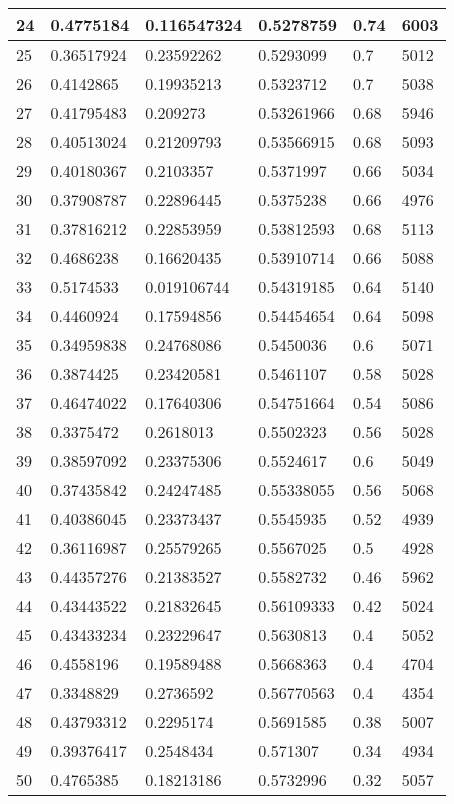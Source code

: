 \begin{longtable}{|l|l|l|l|l|l|}
24 & 0.4775184 & 0.116547324 & 0.5278759 & 0.74 & 6003 \\ \hline 
25 & 0.36517924 & 0.23592262 & 0.5293099 & 0.7 & 5012 \\ \hline 
26 & 0.4142865 & 0.19935213 & 0.5323712 & 0.7 & 5038 \\ \hline 
27 & 0.41795483 & 0.209273 & 0.53261966 & 0.68 & 5946 \\ \hline 
28 & 0.40513024 & 0.21209793 & 0.53566915 & 0.68 & 5093 \\ \hline 
29 & 0.40180367 & 0.2103357 & 0.5371997 & 0.66 & 5034 \\ \hline 
30 & 0.37908787 & 0.22896445 & 0.5375238 & 0.66 & 4976 \\ \hline 
31 & 0.37816212 & 0.22853959 & 0.53812593 & 0.68 & 5113 \\ \hline 
32 & 0.4686238 & 0.16620435 & 0.53910714 & 0.66 & 5088 \\ \hline 
33 & 0.5174533 & 0.019106744 & 0.54319185 & 0.64 & 5140 \\ \hline 
34 & 0.4460924 & 0.17594856 & 0.54454654 & 0.64 & 5098 \\ \hline 
35 & 0.34959838 & 0.24768086 & 0.5450036 & 0.6 & 5071 \\ \hline 
36 & 0.3874425 & 0.23420581 & 0.5461107 & 0.58 & 5028 \\ \hline 
37 & 0.46474022 & 0.17640306 & 0.54751664 & 0.54 & 5086 \\ \hline 
38 & 0.3375472 & 0.2618013 & 0.5502323 & 0.56 & 5028 \\ \hline 
39 & 0.38597092 & 0.23375306 & 0.5524617 & 0.6 & 5049 \\ \hline 
40 & 0.37435842 & 0.24247485 & 0.55338055 & 0.56 & 5068 \\ \hline 
41 & 0.40386045 & 0.23373437 & 0.5545935 & 0.52 & 4939 \\ \hline 
42 & 0.36116987 & 0.25579265 & 0.5567025 & 0.5 & 4928 \\ \hline 
43 & 0.44357276 & 0.21383527 & 0.5582732 & 0.46 & 5962 \\ \hline 
44 & 0.43443522 & 0.21832645 & 0.56109333 & 0.42 & 5024 \\ \hline 
45 & 0.43433234 & 0.23229647 & 0.5630813 & 0.4 & 5052 \\ \hline 
46 & 0.4558196 & 0.19589488 & 0.5668363 & 0.4 & 4704 \\ \hline 
47 & 0.3348829 & 0.2736592 & 0.56770563 & 0.4 & 4354 \\ \hline 
48 & 0.43793312 & 0.2295174 & 0.5691585 & 0.38 & 5007 \\ \hline 
49 & 0.39376417 & 0.2548434 & 0.571307 & 0.34 & 4934 \\ \hline 
50 & 0.4765385 & 0.18213186 & 0.5732996 & 0.32 & 5057 \\ \hline 
\end{longtable}